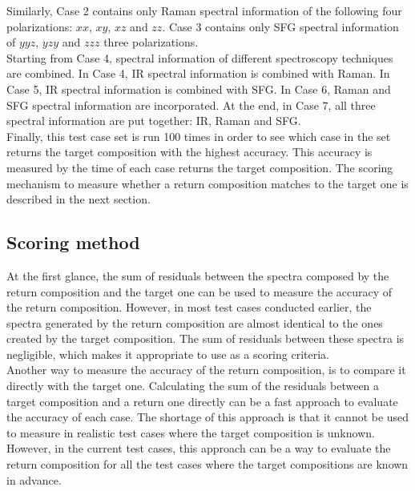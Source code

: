 Similarly, Case 2 contains only Raman spectral information of the following four polarizations: $xx$, $xy$, $xz$ and $zz$. Case 3 contains only SFG spectral information of $yyz$, $yzy$ and $zzz$ three polarizations. \\

Starting from Case 4, spectral information of different spectroscopy techniques are combined. In Case 4, IR spectral information is combined with Raman. In Case 5, IR spectral information is combined with SFG. In Case 6, Raman and SFG spectral information are incorporated. At the end, in Case 7, all three spectral information are put together: IR, Raman and SFG. \\

Finally, this test case set is run 100 times in order to see which case in the set returns the target composition with the highest accuracy. This accuracy is measured by the time of each case returns the target composition. The scoring mechanism to measure whether a return composition matches to the target one is described in the next section. \\

\subsection{Scoring method}

At the first glance, the sum of residuals between the spectra composed by the return composition and the target one can be used to measure the accuracy of the return composition. However, in most test cases conducted earlier, the spectra generated by the return composition are almost identical to the ones created by the target composition. The sum of residuals between these spectra is negligible, which makes it appropriate to use as a scoring criteria. \\

Another way to measure the accuracy of the return composition, is to compare it directly with the target one. Calculating the sum of the residuals between a target composition and a return one directly can be a fast approach to evaluate the accuracy of each case. The shortage of this approach is that it cannot be used to measure in realistic test cases where the target composition is unknown. However, in the current test cases, this approach can be a way to evaluate the return composition for all the test cases where the target compositions are known in advance. \\

